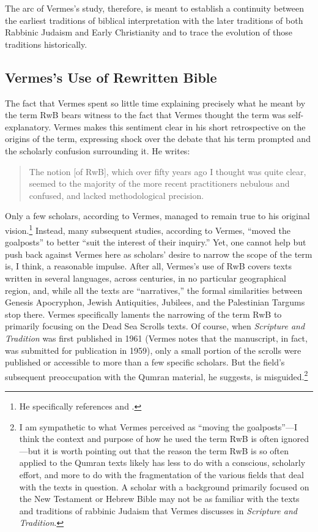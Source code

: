 The arc of Vermes's study, therefore, is meant to establish a continuity
between the earliest traditions of biblical interpretation with the
later traditions of both Rabbinic Judaism and Early Christianity and to
trace the evolution of those traditions historically.

\hypertarget{vermess-use-of-rwb}{%
\subsection{Vermes's Use of Rewritten Bible}\label{vermess-use-of-rwb}}

The fact that Vermes spent so little time explaining precisely what he
meant by the term RwB bears witness to the fact that Vermes thought the
term was self-explanatory. Vermes makes this sentiment clear in his
short retrospective on the origins of the term, expressing shock over
the debate that his term prompted and the scholarly confusion
surrounding it. He writes:

\begin{quote}
The notion {[}of RwB{]}, which over fifty years ago I thought was quite
clear, seemed to the majority of the more recent practitioners nebulous
and confused, and lacked methodological
precision.\autocite[3]{vermes_zsengeller2014}
\end{quote}

Only a few scholars, according to Vermes, managed to remain true to his
original vision.\footnote{He specifically references
  \textcite{alexander_carson-williamson1988} and
  \textcite{bernstein_textus2005}.} Instead, many subsequent studies,
according to Vermes, ``moved the goalposts'' to better ``suit the
interest of their inquiry.''\autocite[4]{vermes_zsengeller2014} Yet, one
cannot help but push back against Vermes here as scholars' desire to
narrow the scope of the term is, I think, a reasonable impulse. After
all, Vermes's use of RwB covers texts written in several languages,
across centuries, in no particular geographical region, and, while all
the texts are ``narratives,'' the formal similarities between
Genesis Apocryphon, Jewish Antiquities, Jubilees, and the
Palestinian Targums stop there. Vermes specifically laments the
narrowing of the term RwB to primarily focusing on the Dead Sea Scrolls
texts. Of course, when \emph{Scripture and Tradition} was first
published in 1961 (Vermes notes that the manuscript, in fact, was
submitted for publication in 1959), only a small portion of the scrolls
were published or accessible to more than a few specific scholars. But
the field's subsequent preoccupation with the Qumran material, he
suggests, is misguided.\footnote{I am sympathetic to what Vermes
  perceived as ``moving the goalposts''---I think the context and
  purpose of how he used the term RwB is often ignored---but it is worth
  pointing out that the reason the term RwB is so often applied to the
  Qumran texts likely has less to do with a conscious, scholarly effort,
  and more to do with the fragmentation of the various fields that deal
  with the texts in question. A scholar with a background primarily
  focused on the New Testament or Hebrew Bible may not be as familiar
  with the texts and traditions of rabbinic Judaism that Vermes
  discusses in \emph{Scripture and Tradition}.}

